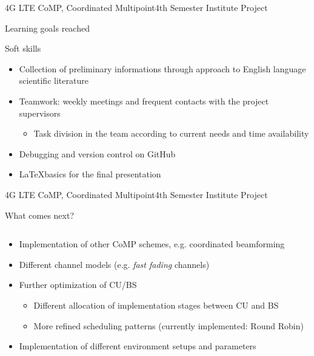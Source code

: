 \documentclass[xcolor={cmyk}]{beamer}
\begin{document}
\begin{frame}{4G LTE CoMP, Coordinated Multipoint}{4th Semester Institute Project}
	 \begin{block}{Learning goals reached}
    	\hspace*{.1\linewidth}\begin{minipage}{.8\linewidth}
    		\begin{block}{Soft skills}
      			\begin{itemize}
      				\item Collection of preliminary informations through approach to English language scientific literature
      				\item Teamwork: weekly meetings and frequent contacts with the project supervisors
      				\begin{itemize}
      					\item Task division in the team according to current needs and time availability
      				\end{itemize}
      				\item Debugging and version control on GitHub
      				\item \LaTeX basics for the final presentation
      			\end{itemize}
    		\end{block}
    	\end{minipage}
	 \end{block}	 
 \end{frame}

 \begin{frame}{4G LTE CoMP, Coordinated Multipoint}{4th Semester Institute Project}
	 \begin{block}{What comes next?}
	 	\begin{columns}
			\begin{column}{.9\textwidth}
				\begin{itemize}
					\item Implementation of other CoMP schemes, e.g. coordinated beamforming
					\item Different channel models (e.g. \textit{fast fading} channels)
					\item Further optimization of CU/BS
					\begin{itemize}
						\item Different allocation of implementation stages between CU and BS
						\item More refined scheduling patterns (currently implemented: Round Robin)
					\end{itemize}
					\item Implementation of different environment setups and parameters
				\end{itemize}
			\end{column}
		\end{columns}
	 \end{block}
 \end{frame}
\end{document}
